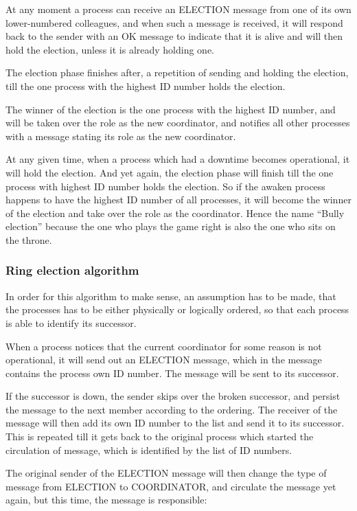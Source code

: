 At any moment a process can receive an ELECTION message from one of its own lower-numbered colleagues, and when such a message is received, it will respond back to the sender with an OK message to indicate that it is alive and will then hold the election, unless it is already holding one.

The election phase finishes after, a repetition of sending and holding the election, till the one process with the highest ID number holds the election.

The winner of the election is the one process with the highest ID number, and will be taken over the role as the new coordinator, and notifies all other processes with a message stating its role as the new coordinator.

At any given time, when a process which had a downtime becomes operational, it will hold the election.
And yet again, the election phase will finish till the one process with highest ID number holds the election. So if the awaken process happens to have the highest ID number of all processes, it will become the winner of the election and take over the role as the coordinator. Hence the name “Bully election” because the one who plays the game right is also the one who sits on the throne.

\subsubsection{Ring election algorithm}
In order for this algorithm to make sense, an assumption has to be made, that the processes has to be either physically or logically ordered, so that each process is able to identify its successor.

When a process notices that the current coordinator for some reason is not operational, it will send out an ELECTION message, which in the message contains the process own ID number. The message will be sent to its successor.

If the successor is down, the sender skips over the broken successor, and persist the message to the next member according to the ordering. The receiver of the message will then add its own ID number to the list and send it to its successor. This is repeated till it gets back to the original process which started the circulation of message, which is identified by the list of ID numbers.

The original sender of the ELECTION message will then change the type of message from ELECTION to COORDINATOR, and circulate the message yet again, but this time, the message is responsible:

